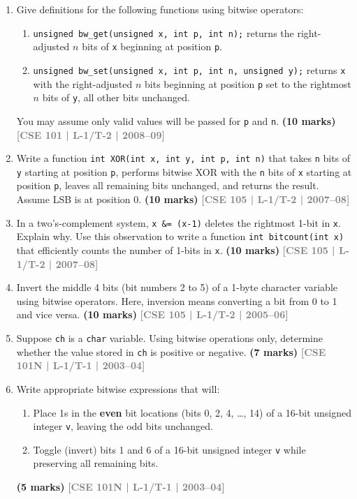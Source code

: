 \documentclass[12pt,a3paper]{article}
\newcommand{\yr}[1]{\hfill\textcolor{gray}{\small\textbf{[#1]}}}
\newcommand{\mk}[1]{\textcolor{orange!70!black}{\small\textbf{(#1 marks)}}}
\begin{document}
\begin{enumerate}
\item Give definitions for the following functions using bitwise operators:
\begin{enumerate}
  \item \texttt{unsigned bw\_get(unsigned x, int p, int n);} \quad returns the right-adjusted $n$ bits of \texttt{x} beginning at position \texttt{p}.
  \item \texttt{unsigned bw\_set(unsigned x, int p, int n, unsigned y);} \quad returns \texttt{x} with the right-adjusted $n$ bits beginning at position \texttt{p} set to the rightmost $n$ bits of \texttt{y}, all other bits unchanged.
\end{enumerate}
You may assume only valid values will be passed for \texttt{p} and \texttt{n}.
\mk{10} \yr{CSE 101 | L-1/T-2 | 2008--09}

\item Write a function \texttt{int XOR(int x, int y, int p, int n)} that takes \texttt{n} bits of \texttt{y} starting at position \texttt{p}, performs bitwise XOR with the \texttt{n} bits of \texttt{x} starting at position \texttt{p}, leaves all remaining bits unchanged, and returns the result. Assume LSB is at position 0.
\mk{10} \yr{CSE 105 | L-1/T-2 | 2007--08}

\item In a two's-complement system, \texttt{x \&= (x-1)} deletes the rightmost 1-bit in \texttt{x}. Explain why. Use this observation to write a function \texttt{int bitcount(int x)} that efficiently counts the number of 1-bits in \texttt{x}.
\mk{10} \yr{CSE 105 | L-1/T-2 | 2007--08}

\item Invert the middle 4 bits (bit numbers 2 to 5) of a 1-byte character variable using bitwise operators. Here, inversion means converting a bit from 0 to 1 and vice versa.
\mk{10} \yr{CSE 105 | L-1/T-2 | 2005--06}

\item Suppose \texttt{ch} is a \texttt{char} variable. Using bitwise operations only, determine whether the value stored in \texttt{ch} is positive or negative.
\mk{7} \yr{CSE 101N | L-1/T-1 | 2003--04}

\item Write appropriate bitwise expressions that will:
\begin{enumerate}
  \item Place 1s in the \textbf{even} bit locations (bits 0, 2, 4, \ldots, 14) of a 16-bit unsigned integer \texttt{v}, leaving the odd bits unchanged.
  \item Toggle (invert) bits 1 and 6 of a 16-bit unsigned integer \texttt{v} while preserving all remaining bits.
\end{enumerate}
\mk{5} \yr{CSE 101N | L-1/T-1 | 2003--04}


\end{enumerate}
\end{document}
